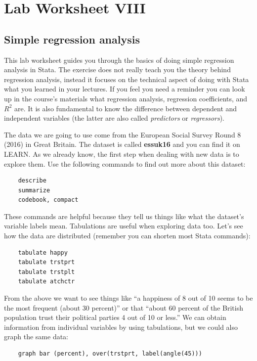 \documentclass{article}
\begin{document}
	
\section*{\hfil Lab Worksheet VIII \hfil}
\subsection*{Simple regression analysis}

This lab worksheet guides you through the basics of doing simple regression analysis in Stata. The exercise does not really teach you the theory behind regression analysis, instead it focuses on the technical aspect of doing with Stata what you learned in your lectures. If you feel you need a reminder you can look up in the course's materials what regression analysis, regression coefficients, and $R^2$ are. It is also fundamental to know the difference between dependent and independent variables (the latter are also called \textit{predictors} or \textit{regressors}).

The data we are going to use come from the European Social Survey Round 8 (2016) in Great Britain. The dataset is called \textbf{essuk16} and you can find it on LEARN. As we already know, the first step when dealing with new data is to explore them. Use the following commands to find out more about this dataset:

\begin{lstlisting}
	describe
	summarize
	codebook, compact
\end{lstlisting}

These commands are helpful because they tell us things like what the dataset's variable labels mean. Tabulations are useful when exploring data too. Let's see how the data are distributed (remember you can shorten most Stata commands):

\begin{lstlisting}
	tabulate happy
	tabulate trstprt
	tabulate trstplt
	tabulate atchctr
\end{lstlisting}

From the above we want to see things like ``a happiness of 8 out of 10 seems to be the most frequent (about 30 percent)'' or that ``about 60 percent of the British population trust their political parties 4 out of 10 or less.'' We can obtain information from individual variables by using tabulations, but we could also graph the same data:

\begin{lstlisting}
	graph bar (percent), over(trstprt, label(angle(45)))
\end{lstlisting}
\end{document}
